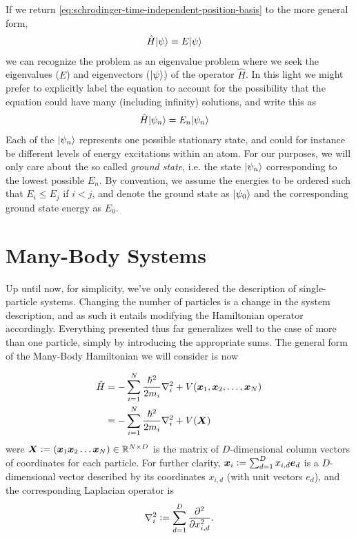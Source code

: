 \documentclass[Thesis.tex]{subfiles}
\begin{document}
If we return \autoref{eq:schrodinger-time-independent-position-basis} to the more general
form,
\begin{align}
    \hat H | \psi \rangle &= E| \psi \rangle
\end{align}
we can recognize the problem as an eigenvalue problem where we seek the eigenvalues ($E$)
and eigenvectors ($| \psi \rangle$) of the operator $\hat H$. In this light we might prefer to
explicitly label the equation to account for the possibility that the equation could have
many (including infinity) solutions, and write this as
\begin{align}
    \hat H| \psi_n \rangle &= E_n| \psi_n \rangle
\end{align}
Each of the $| \psi_n \rangle$ represents one possible stationary state, and could for instance be
different levels of energy excitations within an atom. For our purposes, we will only care
about the so called \emph{ground state}, i.e. the state $| \psi_n \rangle$ corresponding to the
lowest possible $E_n$. By convention, we assume the energies to be ordered such that $E_i
\leq E_j$ if $i < j$, and denote the ground state as $| \psi_0 \rangle$ and the corresponding ground
state energy as $E_0$.


\section{Many-Body Systems}

Up until now, for simplicity, we've only considered the description of single-particle
systems. Changing the number of particles is a change in the system description, and as
such it entails modifying the Hamiltonian operator accordingly. Everything presented thus
far generalizes well to the case of more than one particle, simply by introducing the
appropriate sums. The general form of the Many-Body Hamiltonian we will consider is now

\begin{align}
    \hat H &= - \sum_{i=1}^N \frac{\hbar^2}{2m_i} \laplacian_i + V(\vb x_1, \vb x_2,\dots,
    \vb x_N)\\
    &= -\sum_{i=1}^N \frac{\hbar^2}{2m_i} \laplacian_i + V(\vb
    X)\label{eq:Hamiltonian-operator-general}
\end{align}
were $\mat X \defeq (\vb x_1 \vb x_2\dots\vb x_N)\in \mathbb{R}^{N\times D}$ is the matrix
of $D$-dimensional column vectors of coordinates for each particle. For further clarity,
$\bm{x}_i \vcentcolon= \sum_{d=1}^D x_{i,d} \bm{e}_d$ is a $D$-dimensional vector described by
its coordinates $x_{i,d}$ (with unit vectors $e_d$), and the corresponding Laplacian
operator is
\begin{align}
    \laplacian_i \defeq \sum_{d = 1}^D \pdv[2]{}{x_{i,d}}.
\end{align}
\end{document}
